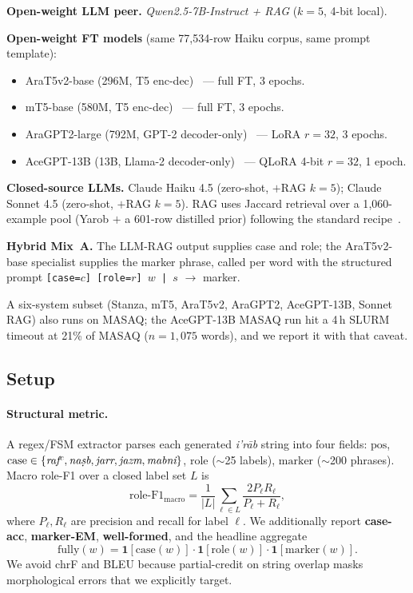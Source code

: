 \documentclass[10pt,a4paper,twocolumn]{article}
\newcommand{\irab}{\textit{i'r{\=a}b}}
\begin{document}
\noindent\textbf{Open-weight LLM peer.} \emph{Qwen2.5-7B-Instruct + RAG} ($k{=}5$, 4-bit local).

\noindent\textbf{Open-weight FT models} (same 77{,}534-row Haiku corpus, same prompt template):
\begin{itemize}[leftmargin=*,topsep=1pt,itemsep=1pt]
\item AraT5v2-base (296M, T5 enc-dec)~\cite{nagoudi2023arat5} --- full FT, 3 epochs.
\item mT5-base (580M, T5 enc-dec)~\cite{xue2021mt5} --- full FT, 3 epochs.
\item AraGPT2-large (792M, GPT-2 decoder-only)~\cite{antoun2021aragpt2} --- LoRA $r{=}32$, 3 epochs.
\item AceGPT-13B (13B, Llama-2 decoder-only)~\cite{huang2024acegpt} --- QLoRA 4-bit $r{=}32$, 1 epoch.
\end{itemize}

\noindent\textbf{Closed-source LLMs.} Claude Haiku 4.5 (zero-shot, $+$RAG $k{=}5$); Claude Sonnet 4.5 (zero-shot, $+$RAG $k{=}5$). RAG uses Jaccard retrieval over a 1{,}060-example pool (Yarob $+$ a 601-row distilled prior) following the standard recipe~\cite{lewis2020rag}.

\noindent\textbf{Hybrid Mix~A.} The LLM-RAG output supplies case and role; the AraT5v2-base specialist supplies the marker phrase, called per word with the structured prompt \texttt{[case=$c$] [role=$r$] $w$ | $s$} $\rightarrow$ marker.

A six-system subset (Stanza, mT5, AraT5v2, AraGPT2, AceGPT-13B, Sonnet RAG) also runs on MASAQ; the AceGPT-13B MASAQ run hit a 4\,h SLURM timeout at 21\% of MASAQ ($n{=}1{,}075$ words), and we report it with that caveat.

\subsection{Setup}
\label{sec:setup}

\paragraph{Structural metric.}
A regex/FSM extractor parses each generated \irab{} string into four fields: $\mathrm{pos}$, $\mathrm{case}\in\{\textit{raf\textsuperscript{c}}, \textit{na\d{s}b}, \textit{jarr}, \textit{jazm}, \textit{mabni}\}$, $\mathrm{role}$ ($\sim$25 labels), $\mathrm{marker}$ ($\sim$200 phrases). Macro role-F1 over a closed label set $L$ is
\begin{equation}
\text{role-F1}_{\text{macro}} = \frac{1}{|L|}\sum_{\ell \in L} \frac{2 P_\ell R_\ell}{P_\ell + R_\ell},
\label{eq:f1}
\end{equation}
where $P_\ell, R_\ell$ are precision and recall for label $\ell$. We additionally report \textbf{case-acc}, \textbf{marker-EM}, \textbf{well-formed}, and the headline aggregate
\begin{equation}
\mathrm{fully}(w) = \mathbf{1}[\mathrm{case}(w)] \cdot \mathbf{1}[\mathrm{role}(w)] \cdot \mathbf{1}[\mathrm{marker}(w)].
\label{eq:fully}
\end{equation}
We avoid chrF and BLEU because partial-credit on string overlap masks morphological errors that we explicitly target.
\end{document}
